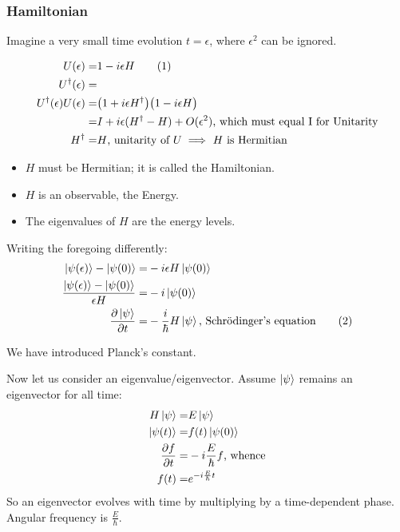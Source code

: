 \documentclass[]{article}
\newcommand\numberthis{\addtocounter{equation}{1}\tag{\theequation}}
\begin{document}
\subsubsection{Hamiltonian}

Imagine a very small time evolution $t=\epsilon$, where $\epsilon^2$ can be ignored.

\begin{align*}
	U(\epsilon) =& 1 - i \epsilon H \numberthis \label{eq:introducing:hamiltonian}\\
	U^\dagger (\epsilon) =& \\
	U^\dagger (\epsilon)U(\epsilon) =& \big(1 + i \epsilon H^\dagger\big)\big(1 - i \epsilon H\big)\\
	=& I + i\epsilon (H^\dagger-H) + O(\epsilon^2) \text{, which must equal I for Unitarity}\\
	H^\dagger=& H \text{, unitarity of $U\implies$ $H$ is Hermitian}
\end{align*}

\begin{itemize}
	\item $H$ must be Hermitian; it is called the Hamiltonian.
	\item $H$ is an observable, the Energy.
	\item The eigenvalues of $H$ are the energy levels.
\end{itemize}
Writing the foregoing differently:
\begin{align*}
	\ket{\psi(\epsilon)} - \ket{\psi(0)} =& -i \epsilon H \ket{\psi(0)}\\
	\frac{\ket{\psi(\epsilon)} - \ket{\psi(0)}}{\epsilon H } =& -i \ket{\psi(0)}\\
	\frac{\partial \ket{\psi}}{\partial t} =& -\frac{i}{\hbar}  H \ket{\psi} \text{, Schr\"odinger's equation} \numberthis \label{eq:schroedinger}
\end{align*}

We have introduced Planck's constant.

Now let us consider an eigenvalue/eigenvector. Assume $\ket{\psi}$ remains an eigenvector for all time:
\begin{align*}
	H \ket{\psi} =& E \ket{\psi} \\
	\ket{\psi(t)} =& f(t) \ket{\psi(0)}\\
	\frac{\partial f}{\partial t} =&-i \frac{E}{\hbar}f\text{, whence}\\
	f(t) =& e^{-i \frac{E}{\hbar} t}
\end{align*}
So an eigenvector evolves with time by multiplying by a time-dependent phase. Angular frequency is $\frac{E}{\hbar}$.
\end{document}
